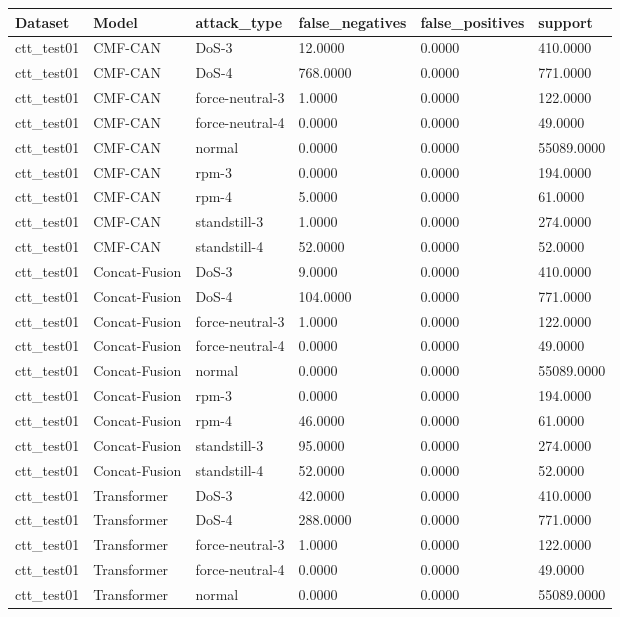 \begin{tabular}{llllll}
\toprule
Dataset & Model & attack_type & false_negatives & false_positives & support \\
\midrule
ctt_test01 & CMF-CAN & DoS-3 & 12.0000 & 0.0000 & 410.0000 \\
ctt_test01 & CMF-CAN & DoS-4 & 768.0000 & 0.0000 & 771.0000 \\
ctt_test01 & CMF-CAN & force-neutral-3 & 1.0000 & 0.0000 & 122.0000 \\
ctt_test01 & CMF-CAN & force-neutral-4 & 0.0000 & 0.0000 & 49.0000 \\
ctt_test01 & CMF-CAN & normal & 0.0000 & 0.0000 & 55089.0000 \\
ctt_test01 & CMF-CAN & rpm-3 & 0.0000 & 0.0000 & 194.0000 \\
ctt_test01 & CMF-CAN & rpm-4 & 5.0000 & 0.0000 & 61.0000 \\
ctt_test01 & CMF-CAN & standstill-3 & 1.0000 & 0.0000 & 274.0000 \\
ctt_test01 & CMF-CAN & standstill-4 & 52.0000 & 0.0000 & 52.0000 \\
ctt_test01 & Concat-Fusion & DoS-3 & 9.0000 & 0.0000 & 410.0000 \\
ctt_test01 & Concat-Fusion & DoS-4 & 104.0000 & 0.0000 & 771.0000 \\
ctt_test01 & Concat-Fusion & force-neutral-3 & 1.0000 & 0.0000 & 122.0000 \\
ctt_test01 & Concat-Fusion & force-neutral-4 & 0.0000 & 0.0000 & 49.0000 \\
ctt_test01 & Concat-Fusion & normal & 0.0000 & 0.0000 & 55089.0000 \\
ctt_test01 & Concat-Fusion & rpm-3 & 0.0000 & 0.0000 & 194.0000 \\
ctt_test01 & Concat-Fusion & rpm-4 & 46.0000 & 0.0000 & 61.0000 \\
ctt_test01 & Concat-Fusion & standstill-3 & 95.0000 & 0.0000 & 274.0000 \\
ctt_test01 & Concat-Fusion & standstill-4 & 52.0000 & 0.0000 & 52.0000 \\
ctt_test01 & Transformer & DoS-3 & 42.0000 & 0.0000 & 410.0000 \\
ctt_test01 & Transformer & DoS-4 & 288.0000 & 0.0000 & 771.0000 \\
ctt_test01 & Transformer & force-neutral-3 & 1.0000 & 0.0000 & 122.0000 \\
ctt_test01 & Transformer & force-neutral-4 & 0.0000 & 0.0000 & 49.0000 \\
ctt_test01 & Transformer & normal & 0.0000 & 0.0000 & 55089.0000 \\

\end{tabular}
